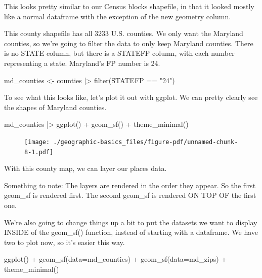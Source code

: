 \documentclass[
  letterpaper,
  DIV=11,
  numbers=noendperiod]{scrreprt}
\newenvironment{Shaded}{\begin{snugshade}}{\end{snugshade}}
\newcommand{\AttributeTok}[1]{\textcolor[rgb]{0.40,0.45,0.13}{#1}}
\newcommand{\FunctionTok}[1]{\textcolor[rgb]{0.28,0.35,0.67}{#1}}
\newcommand{\NormalTok}[1]{\textcolor[rgb]{0.00,0.23,0.31}{#1}}
\newcommand{\OtherTok}[1]{\textcolor[rgb]{0.00,0.23,0.31}{#1}}
\newcommand{\SpecialCharTok}[1]{\textcolor[rgb]{0.37,0.37,0.37}{#1}}
\newcommand{\StringTok}[1]{\textcolor[rgb]{0.13,0.47,0.30}{#1}}
\begin{document}
This looks pretty similar to our Census blocks shapefile, in that it
looked mostly like a normal dataframe with the exception of the new
geometry column.

This county shapefile has all 3233 U.S. counties. We only want the
Maryland counties, so we're going to filter the data to only keep
Maryland counties. There is no STATE column, but there is a STATEFP
column, with each number representing a state. Maryland's FP number is
24.

\begin{Shaded}
\begin{Highlighting}[]
\NormalTok{md\_counties }\OtherTok{\textless{}{-}}\NormalTok{ counties }\SpecialCharTok{|\textgreater{}}
  \FunctionTok{filter}\NormalTok{(STATEFP }\SpecialCharTok{==} \StringTok{"24"}\NormalTok{)}
\end{Highlighting}
\end{Shaded}

To see what this looks like, let's plot it out with ggplot. We can
pretty clearly see the shapes of Maryland counties.

\begin{Shaded}
\begin{Highlighting}[]
\NormalTok{md\_counties }\SpecialCharTok{|\textgreater{}}
  \FunctionTok{ggplot}\NormalTok{() }\SpecialCharTok{+}
  \FunctionTok{geom\_sf}\NormalTok{() }\SpecialCharTok{+}
  \FunctionTok{theme\_minimal}\NormalTok{()}
\end{Highlighting}
\end{Shaded}

\begin{figure}[H]

{\centering \texttt{[image: ./geographic-basics\_files/figure-pdf/unnamed-chunk-8-1.pdf]}

}

\end{figure}

With this county map, we can layer our places data.

Something to note: The layers are rendered in the order they appear. So
the first geom\_sf is rendered first. The second geom\_sf is rendered ON
TOP OF the first one.

We're also going to change things up a bit to put the datasets we want
to display INSIDE of the geom\_sf() function, instead of starting with a
dataframe. We have two to plot now, so it's easier this way.

\begin{Shaded}
\begin{Highlighting}[]
\FunctionTok{ggplot}\NormalTok{() }\SpecialCharTok{+}
  \FunctionTok{geom\_sf}\NormalTok{(}\AttributeTok{data=}\NormalTok{md\_counties) }\SpecialCharTok{+}
  \FunctionTok{geom\_sf}\NormalTok{(}\AttributeTok{data=}\NormalTok{md\_zips) }\SpecialCharTok{+}
  \FunctionTok{theme\_minimal}\NormalTok{()}
\end{Highlighting}
\end{Shaded}
\end{document}
